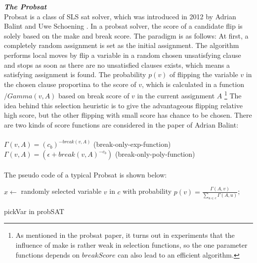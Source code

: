 \documentclass[12pt,a4paper,twoside]{scrartcl}
\numberwithin{equation}{section}
\begin{document}
\emph{\textbf{The Probsat}}\\
Probsat is a class of SLS sat solver, which was introduced in 2012 by Adrian Balint and Uwe Schoening \cite{balint2016engineering}. In a probsat solver, the score of a candidate flip is solely based on the make and break score. The paradigm is as follows: At first, a completely random assignment is set as the initial assignment. The algorithm performs local moves by flip a variable in a random chosen unsatisfying clause and stops as soon as there are no unsatisfied clauses exists, which means a satisfying assignment is found. The probability $p(v)$ of flipping the variable $v$ in the chosen clause proportina to the score of $v$, which is calculated in a function $/Gamma(v,A)$ based on break score of $v$ in the current assignment $A$ \footnote{As mentioned in the probsat paper, it turns out in experiments that the influence of make is rather weak in selection functions, so the one parameter functions depends on $breakScore$ can also lead to an efficient algorithm.} The idea behind this selection heuristic is to give the advantageous flipping relative high score, but the other flipping with small score has chance to be chosen.  There are two kinds of score functions are considered in the paper of Adrian Balint: \\
\\
$\Gamma(v,A) = (c_b)^{-break(v,A)}$ (break-only-exp-function) \\
$\Gamma(v,A)=(\epsilon +break(v,A)^{-c_b})$  (break-only-poly-function)\\ 
\\
The pseudo code of a typical Probsat is shown below:\\
\begin{algorithm}[H]
  $x \leftarrow$ randomly selected  variable $v$ in $c$ with probability $p(v) =\frac{\Gamma(A,v)}{\sum_{u \in c}\Gamma(A,u)}$; 
 \caption{pickVar in probSAT}
\end{algorithm} 
\end{document}
